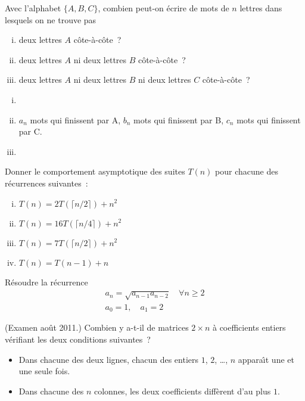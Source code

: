 \begin{exo}
Avec l'alphabet $\{A,B,C\}$, combien peut-on \'ecrire de mots de $n$ lettres dans lesquels on ne trouve pas
%
\begin{enumerate}[(i)]
\item deux lettres $A$ c\^ote-\`a-c\^ote~?
\item deux lettres $A$ ni deux lettres $B$ c\^ote-\`a-c\^ote~?
\item deux lettres $A$ ni deux lettres $B$ ni deux lettres $C$ c\^ote-\`a-c\^ote~?
\end{enumerate}
\end{exo}

\begin{enumerate}[(i)]
\item

\item $a_n$ mots qui finissent par A, $b_n$ mots qui finissent par B, $c_n$ mots qui finissent par C.

\item 
\end{enumerate}

\begin{exo}
Donner le comportement asymptotique des suites $T(n)$ pour chacune des r\'ecurrences suivantes~:
%
\begin{enumerate}[(i)]
\item $T(n) = 2T(\lceil n/2 \rceil) + n^2$
\item $T(n) = 16T(\lceil n/4 \rceil) + n^2$
\item $T(n) = 7 T(\lceil n/2 \rceil) + n^2$
\item $T(n) = T(n-1) + n$
\end{enumerate}
\end{exo}

\begin{exo}
R\'esoudre la r\'ecurrence
$$
\begin{array}{l}
a_n = \sqrt{a_{n-1} a_{n-2}} \quad \forall n \geqslant 2\\
a_0 = 1, \quad a_1 = 2
\end{array}
$$
\end{exo}

\begin{exo} (Examen ao\^ut 2011.)
Combien y a-t-il de matrices $2 \times n$ \`a coefficients entiers v\'erifiant les deux conditions suivantes~?
%
\begin{itemize}
\item Dans chacune des deux lignes, chacun des entiers $1$, $2$, \ldots, $n$ appara\^\i{}t une et une seule fois.
\item Dans chacune des $n$ colonnes, les deux coefficients diff\`erent d'au plus $1$.
\end{itemize}
\end{exo}